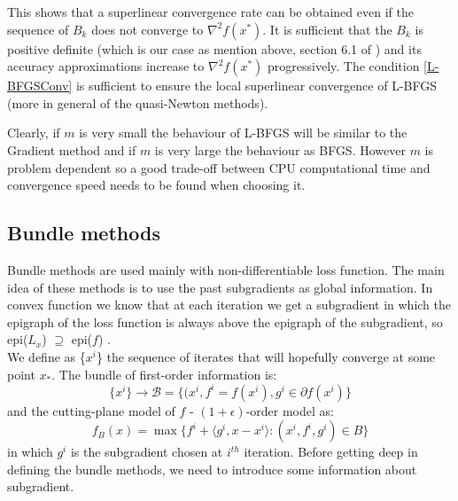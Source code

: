 This shows that a superlinear convergence rate can be obtained even if the sequence of $B_{k}$ does not converge to $\nabla^2f(x^*)$. It is sufficient that the $B_{k}$ is positive definite (which is our case as mention above, section 6.1 of \cite{numerical}) and its accuracy approximations increase to $\nabla^2f(x^*)$ progressively. The condition \ref{L-BFGSConv} is sufficient to ensure the local superlinear convergence of L-BFGS (more in general of the quasi-Newton methods).

Clearly, if $m$ is very small the behaviour of L-BFGS will be similar to the Gradient method and if $m$ is very large the behaviour as BFGS. However $m$ is problem dependent so a good trade-off between CPU computational time and convergence speed needs to be found when choosing it.

\subsection{Bundle methods}
Bundle methods are used mainly with non-differentiable loss function. The main idea of these methods is to use the past subgradients as global information. In convex function we know that at each iteration we get a subgradient in which the epigraph of the loss function is always above the epigraph of the subgradient, so epi($L_x$) $ \supseteq $ epi($f$) .\\ 
We define as \{$x^i$\} the sequence of iterates that will hopefully converge at some point $x_*$. 
The bundle of first-order information is:
\begin{equation}
\{x^i\}\rightarrow \mathcal{B}=\{(x^i, f^i=f(x^i), g^i \in \partial f(x^i)\}
\end{equation}
and the cutting-plane model of $f$ - $(1 +\epsilon)$-order model as:
\begin{equation}
f_B(x) = \max{\{f^i+ \langle g^i,x - x^i \rangle:  (x^i,f^i,g^i)\in B\}}
\end{equation}
in which $g^i$ is the subgradient chosen at $i^{th}$ iteration.
Before getting deep in defining the bundle methods, we need to introduce some information about subgradient.
